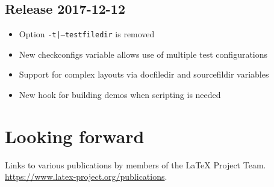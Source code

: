 \documentclass{ltnews}
\begin{document}
\subsection{Release 2017-12-12}

\begin{itemize}
\item Option \texttt{-t|--testfiledir} is removed
\item New checkconfigs variable allows use of multiple test
  configurations
\item Support for complex layouts via docfiledir and sourcefildir
  variables
\item New hook for building demos when scripting is needed
\end{itemize}


\section{}

\section{}





\section{Looking forward}


\begin{thebibliography}{10}
  \raggedright
    Links to various publications by members of the \LaTeX{} Project Team.
    \newblock \url{https://www.latex-project.org/publications}.
\end{thebibliography}
\end{document}
